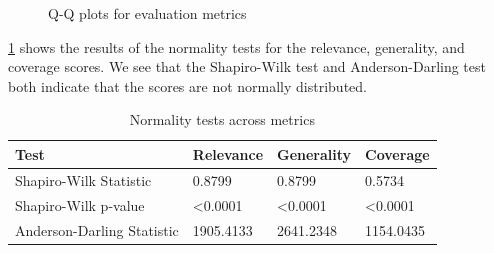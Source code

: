 \begin{figure}[h]
    \centering
    \hfill

    \caption{Q-Q plots for evaluation metrics}
    \label{fig:all_qq_plots}
\end{figure}

\cref{tab:normality_comparison} shows the results of the normality tests for the relevance, generality, and coverage scores. We see that the Shapiro-Wilk test and Anderson-Darling test both indicate that the scores are not normally distributed.

\begin{table}[htbp]
    \centering
    \caption{Normality tests across metrics}
    \begin{tabular}{llll}
        \hline
        \textbf{Test} & \textbf{Relevance} & \textbf{Generality} & \textbf{Coverage} \\
        \hline
        Shapiro-Wilk Statistic & 0.8799 & 0.8799 & 0.5734 \\
        Shapiro-Wilk p-value & <0.0001 & <0.0001 & <0.0001 \\
        Anderson-Darling Statistic & 1905.4133 & 2641.2348 & 1154.0435 \\
        \hline
    \end{tabular}
    \label{tab:normality_comparison}
\end{table}

